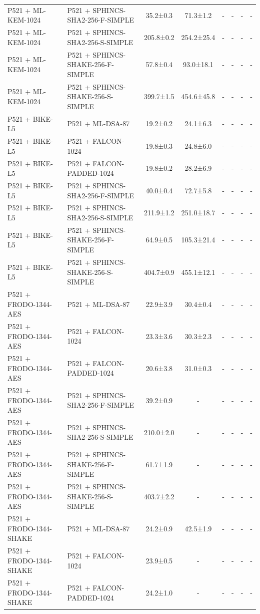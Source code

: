 \documentclass[10pt]{article}
\begin{document}
\begin{tabular}{@{}l l c c c c c c@{}}
P521 + ML-KEM-1024 & P521 + SPHINCS-SHA2-256-F-SIMPLE & 35.2±0.3 & 71.3±1.2 & - & - & - & - \\
P521 + ML-KEM-1024 & P521 + SPHINCS-SHA2-256-S-SIMPLE & 205.8±0.2 & 254.2±25.4 & - & - & - & - \\
P521 + ML-KEM-1024 & P521 + SPHINCS-SHAKE-256-F-SIMPLE & 57.8±0.4 & 93.0±18.1 & - & - & - & - \\
P521 + ML-KEM-1024 & P521 + SPHINCS-SHAKE-256-S-SIMPLE & 399.7±1.5 & 454.6±45.8 & - & - & - & - \\
P521 + BIKE-L5 & P521 + ML-DSA-87 & 19.2±0.2 & 24.1±6.3 & - & - & - & - \\
P521 + BIKE-L5 & P521 + FALCON-1024 & 19.8±0.3 & 24.8±6.0 & - & - & - & - \\
P521 + BIKE-L5 & P521 + FALCON-PADDED-1024 & 19.8±0.2 & 28.2±6.9 & - & - & - & - \\
P521 + BIKE-L5 & P521 + SPHINCS-SHA2-256-F-SIMPLE & 40.0±0.4 & 72.7±5.8 & - & - & - & - \\
P521 + BIKE-L5 & P521 + SPHINCS-SHA2-256-S-SIMPLE & 211.9±1.2 & 251.0±18.7 & - & - & - & - \\
P521 + BIKE-L5 & P521 + SPHINCS-SHAKE-256-F-SIMPLE & 64.9±0.5 & 105.3±21.4 & - & - & - & - \\
P521 + BIKE-L5 & P521 + SPHINCS-SHAKE-256-S-SIMPLE & 404.7±0.9 & 455.1±12.1 & - & - & - & - \\
P521 + FRODO-1344-AES & P521 + ML-DSA-87 & 22.9±3.9 & 30.4±0.4 & - & - & - & - \\
P521 + FRODO-1344-AES & P521 + FALCON-1024 & 23.3±3.6 & 30.3±2.3 & - & - & - & - \\
P521 + FRODO-1344-AES & P521 + FALCON-PADDED-1024 & 20.6±3.8 & 31.0±0.3 & - & - & - & - \\
P521 + FRODO-1344-AES & P521 + SPHINCS-SHA2-256-F-SIMPLE & 39.2±0.9 & - & - & - & - & - \\
P521 + FRODO-1344-AES & P521 + SPHINCS-SHA2-256-S-SIMPLE & 210.0±2.0 & - & - & - & - & - \\
P521 + FRODO-1344-AES & P521 + SPHINCS-SHAKE-256-F-SIMPLE & 61.7±1.9 & - & - & - & - & - \\
P521 + FRODO-1344-AES & P521 + SPHINCS-SHAKE-256-S-SIMPLE & 403.7±2.2 & - & - & - & - & - \\
P521 + FRODO-1344-SHAKE & P521 + ML-DSA-87 & 24.2±0.9 & 42.5±1.9 & - & - & - & - \\
P521 + FRODO-1344-SHAKE & P521 + FALCON-1024 & 23.9±0.5 & - & - & - & - & - \\
P521 + FRODO-1344-SHAKE & P521 + FALCON-PADDED-1024 & 24.2±1.0 & - & - & - & - & - \\

\end{tabular}
\end{document}
